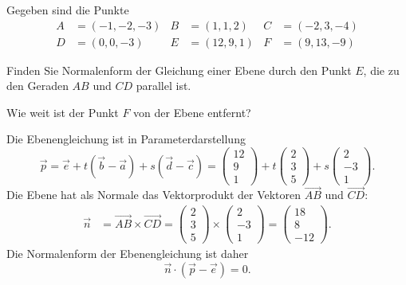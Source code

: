 Gegeben sind die Punkte 
\[
\begin{aligned}
A&=(-1,-2,-3)&
B&=(1,1,2)   &
C&=(-2,3,-4) \\
D&=(0,0,-3)  &
E&=(12,9,1)  &
F&=(9,13,-9)
\end{aligned}
\]
\begin{teilaufgaben}
\item
Finden Sie Normalenform der Gleichung einer Ebene durch den Punkt $E$,
die zu den Geraden $AB$ und $CD$ parallel ist.
\item
Wie weit ist der Punkt $F$ von der Ebene entfernt?
\end{teilaufgaben}

\begin{loesung}
\begin{teilaufgaben}
\item
Die Ebenengleichung ist in Parameterdarstellung 
\[
\vec{p}
=
\vec{e}+t(\vec{b}-\vec{a})+s(\vec{d}-\vec{c})
=
\begin{pmatrix}12\\9\\1\end{pmatrix}
+t
\begin{pmatrix}2\\3\\5\end{pmatrix}
+s
\begin{pmatrix}2\\-3\\1\end{pmatrix}.
\]
Die Ebene hat als Normale das Vektorprodukt der Vektoren $\overrightarrow{AB}$
und $\overrightarrow{CD}$:
\begin{align*}
\vec{n}
&=
\overrightarrow{AB}
\times
\overrightarrow{CD}
=
\begin{pmatrix}2\\3\\5\end{pmatrix}
\times
\begin{pmatrix}2\\-3\\1\end{pmatrix}
=
\begin{pmatrix} 18\\8\\-12 \end{pmatrix}.
\end{align*}
Die Normalenform der Ebenengleichung ist daher
\begin{equation}
\vec{n}\cdot (\vec{p}-\vec{e})=0.
\label{30000061:normalenform}

\end{equation}
\end{teilaufgaben}
\end{loesung}
